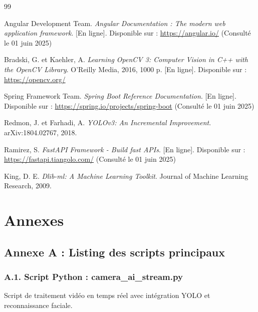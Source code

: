 \documentclass[12pt,a4paper]{report}
\numberwithin{figure}{chapter}
\numberwithin{table}{chapter}
\begin{document}
\begin{thebibliography}{99}

Angular Development Team.
\textit{Angular Documentation : The modern web application framework}.
[En ligne]. Disponible sur : \url{https://angular.io/}
(Consulté le 01 juin 2025)

Bradski, G. et Kaehler, A.
\textit{Learning OpenCV 3: Computer Vision in C++ with the OpenCV Library}.
O'Reilly Media, 2016, 1000 p.
[En ligne]. Disponible sur : \url{https://opencv.org/}

Spring Framework Team.
\textit{Spring Boot Reference Documentation}.
[En ligne]. Disponible sur : \url{https://spring.io/projects/spring-boot}
(Consulté le 01 juin 2025)

Redmon, J. et Farhadi, A.
\textit{YOLOv3: An Incremental Improvement}.
arXiv:1804.02767, 2018.

Ramirez, S.
\textit{FastAPI Framework - Build fast APIs}.
[En ligne]. Disponible sur : \url{https://fastapi.tiangolo.com/}
(Consulté le 01 juin 2025)

King, D. E.
\textit{Dlib-ml: A Machine Learning Toolkit}.
Journal of Machine Learning Research, 2009.

\end{thebibliography}

\appendix
\chapter{Annexes}

\section*{Annexe A : Listing des scripts principaux}

\subsection*{A.1. Script Python : camera\_ai\_stream.py}
Script de traitement vidéo en temps réel avec intégration YOLO et reconnaissance faciale.
\end{document}
